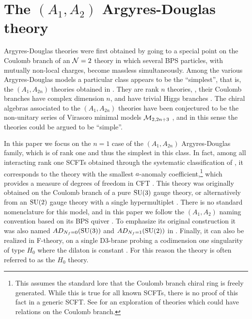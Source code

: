 \section{The \texorpdfstring{$(A_1,A_2)$}{(A1,A2)} Argyres-Douglas theory}
\label{sec:h0background}


Argyres-Douglas theories \cite{Argyres:1995jj,Argyres:1995xn} were first obtained by going to a special point on the Coulomb branch of an ${\mathcal{N}}=2$ theory in which several BPS particles, with mutually non-local charges, become massless simultaneously. 
Among the various Argyres-Douglas models a particular class appears to be the ``simplest'', that is, the $(A_1,A_{2n})$ theories obtained in \cite{Eguchi:1996vu}. 
They are rank $n$ theories, 
\ie, their Coulomb branches have complex dimension $n$, and have trivial Higgs branches \cite{Argyres:2012fu}. 
The  chiral algebras associated to the $(A_1,A_{2n})$ theories have been conjectured to be the non-unitary series of Virasoro minimal models ${\mathcal{M}}_{2,2n+3}$ \cite{rastelli_harvard,Beem:2017ooy}, and in this sense the theories could be argued to be ``simple''. 

In this paper we focus on the $n=1$ case of the $(A_1,A_{2n})$ Argyres-Douglas family, which is of rank one and thus the simplest in this class. In fact, among all interacting rank one SCFTs obtained through the systematic classification of \cite{Argyres:2015ffa,Argyres:2015gha,Argyres:2016xua,Argyres:2016xmc,Argyres:2016yzz}, it corresponds to the theory with the smallest $a$-anomaly coefficient,\footnote{This assumes the standard lore that the Coulomb branch chiral ring is freely generated. While this is true for all known SCFTs, there is no proof of this fact in a generic SCFT. See \cite{Argyres:2017tmj} for an exploration of theories which could have relations on the Coulomb branch.} which provides a measure of degrees of freedom in CFT \cite{Komargodski:2011vj}.
This theory was originally obtained on the Coulomb branch of a pure $\mathrm{SU}(3)$ gauge theory, or alternatively from an $\mathrm{SU}(2)$ gauge theory with a single hypermultiplet \cite{Argyres:1995jj,Argyres:1995xn}.
There is no standard nomenclature for this model, and in this paper we follow the $(A_1,A_2)$ naming convention based on its BPS quiver \cite{Cecotti:2010fi}. To emphasize its original construction it was also named $AD_{N_f=0}(\mathrm{SU}(3))$ and $AD_{N_f=1}(\mathrm{SU}(2))$  in \cite{Tachikawa:2013kta}. Finally, it can also be realized in  F-theory, on a single D3-brane probing a codimension one singularity of type $H_0$ where the dilaton is constant \cite{Dasgupta:1996ij,Aharony:1998xz}. 
For this reason the theory is often referred to as the $H_0$ theory.


